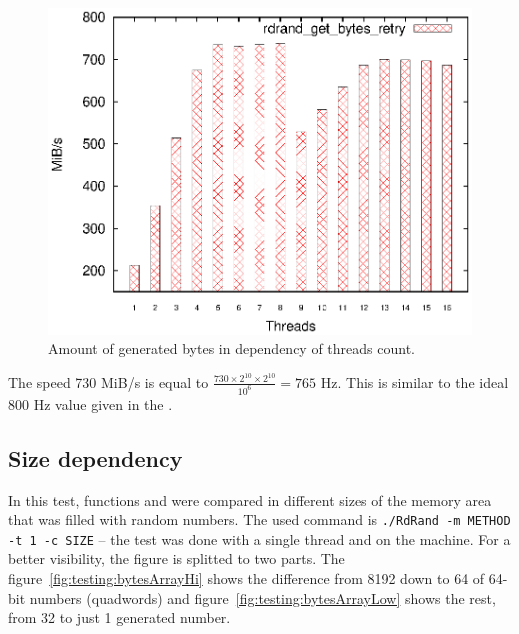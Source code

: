 \begin{figure}[h!]
  \centering
 \includegraphics[width=12cm]{fig/tests/threads_scalability.eps} %
\caption{Amount of generated bytes in dependency of threads count.}
\label{fig:testing:threadsScalability}
\end{figure}

The speed 730 MiB/s is equal to $\frac{730 \times 2^{10} \times 2^{10}}{10^6}=765$ Hz. This is similar to the ideal 800 Hz value given in the .


\subsection{Size dependency}
In this test, functions  and  were compared in different sizes of the memory area that was filled with random numbers. The used command is {\tt ./RdRand -m METHOD -t 1 -c SIZE} -- the test was done with a single thread and on the  machine. For a better visibility, the figure is splitted to two parts. The figure~\ref{fig:testing:bytesArrayHi} shows the difference from 8192 down to 64 of 64-bit numbers (quadwords) and figure~\ref{fig:testing:bytesArrayLow} shows the rest, from 32 to just 1 generated number.

